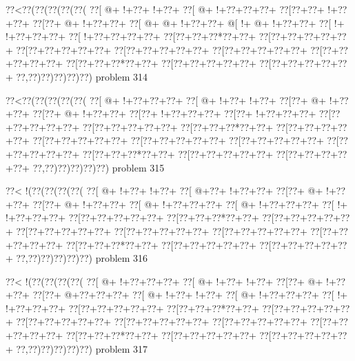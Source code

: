 \vbox{\vbox{\goo
\0??<\0??(\0??(\0??(\0??(\0??(
\0??[\- @+\- !+\0??+\- !+\0??+
\0??[\- @+\- !+\0??+\0??+\0??+
\0??[\0??+\0??+\- !+\0??+\0??+
\0??[\0??+\- @+\- !+\0??+\0??+
\0??[\- @+\- @+\- !+\0??+\0??+
\- @[\- !+\- @+\- !+\0??+\0??+
\0??[\- !+\- !+\0??+\0??+\0??+
\0??[\- !+\0??+\0??+\0??+\0??+
\0??[\0??+\0??+\0??*\0??+\0??+
\0??[\0??+\0??+\0??+\0??+\0??+
\0??[\0??+\0??+\0??+\0??+\0??+
\0??[\0??+\0??+\0??+\0??+\0??+
\0??[\0??+\0??+\0??+\0??+\0??+
\0??[\0??+\0??+\0??+\0??+\0??+
\0??[\0??+\0??+\0??*\0??+\0??+
\0??[\0??+\0??+\0??+\0??+\0??+
\0??[\0??+\0??+\0??+\0??+\0??+
\0??,\0??)\0??)\0??)\0??)\0??)
}
\hfil problem 314\hfil\break
}

\vbox{\vbox{\goo
\0??<\0??(\0??(\0??(\0??(\0??(
\0??[\- @+\- !+\0??+\0??+\0??+
\0??[\- @+\- !+\0??+\- !+\0??+
\0??[\0??+\- @+\- !+\0??+\0??+
\0??[\0??+\- @+\- !+\0??+\0??+
\0??[\0??+\- !+\0??+\0??+\0??+
\0??[\0??+\- !+\0??+\0??+\0??+
\0??[\0??+\0??+\0??+\0??+\0??+
\0??[\0??+\0??+\0??+\0??+\0??+
\0??[\0??+\0??+\0??*\0??+\0??+
\0??[\0??+\0??+\0??+\0??+\0??+
\0??[\0??+\0??+\0??+\0??+\0??+
\0??[\0??+\0??+\0??+\0??+\0??+
\0??[\0??+\0??+\0??+\0??+\0??+
\0??[\0??+\0??+\0??+\0??+\0??+
\0??[\0??+\0??+\0??*\0??+\0??+
\0??[\0??+\0??+\0??+\0??+\0??+
\0??[\0??+\0??+\0??+\0??+\0??+
\0??,\0??)\0??)\0??)\0??)\0??)
}
\hfil problem 315\hfil\break
}

\vbox{\vbox{\goo
\0??<\- !(\0??(\0??(\0??(\0??(
\0??[\- @+\- !+\0??+\- !+\0??+
\0??[\- @+\0??+\- !+\0??+\0??+
\0??[\0??+\- @+\- !+\0??+\0??+
\0??[\0??+\- @+\- !+\0??+\0??+
\0??[\- @+\- !+\0??+\0??+\0??+
\0??[\- @+\- !+\0??+\0??+\0??+
\0??[\- !+\- !+\0??+\0??+\0??+
\0??[\0??+\0??+\0??+\0??+\0??+
\0??[\0??+\0??+\0??*\0??+\0??+
\0??[\0??+\0??+\0??+\0??+\0??+
\0??[\0??+\0??+\0??+\0??+\0??+
\0??[\0??+\0??+\0??+\0??+\0??+
\0??[\0??+\0??+\0??+\0??+\0??+
\0??[\0??+\0??+\0??+\0??+\0??+
\0??[\0??+\0??+\0??*\0??+\0??+
\0??[\0??+\0??+\0??+\0??+\0??+
\0??[\0??+\0??+\0??+\0??+\0??+
\0??,\0??)\0??)\0??)\0??)\0??)
}
\hfil problem 316\hfil\break
}

\vbox{\vbox{\goo
\0??<\- !(\0??(\0??(\0??(\0??(
\0??[\- @+\- !+\0??+\0??+\0??+
\0??[\- @+\- !+\0??+\- !+\0??+
\0??[\0??+\- @+\- !+\0??+\0??+
\0??[\0??+\- @+\0??+\0??+\0??+
\0??[\- @+\- !+\0??+\- !+\0??+
\0??[\- @+\- !+\0??+\0??+\0??+
\0??[\- !+\- !+\0??+\0??+\0??+
\0??[\0??+\0??+\0??+\0??+\0??+
\0??[\0??+\0??+\0??*\0??+\0??+
\0??[\0??+\0??+\0??+\0??+\0??+
\0??[\0??+\0??+\0??+\0??+\0??+
\0??[\0??+\0??+\0??+\0??+\0??+
\0??[\0??+\0??+\0??+\0??+\0??+
\0??[\0??+\0??+\0??+\0??+\0??+
\0??[\0??+\0??+\0??*\0??+\0??+
\0??[\0??+\0??+\0??+\0??+\0??+
\0??[\0??+\0??+\0??+\0??+\0??+
\0??,\0??)\0??)\0??)\0??)\0??)
}
\hfil problem 317\hfil\break
}

